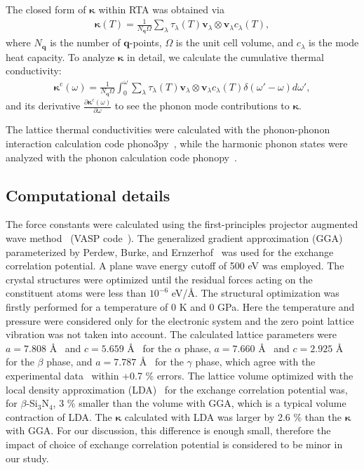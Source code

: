 \documentclass[twocolumn,amsmath,amssymb,a4paper,prb,superscriptaddress,floatfix]{revtex4-1}
\begin{document}
The closed form of $\boldsymbol{\kappa}$ within RTA was obtained via
\begin{align}
 \label{eq:kappa}
 \boldsymbol{\kappa}(T) = \frac{1}{N_\mathbf{q}\Omega} \sum_\lambda
 \tau_\lambda(T) \mathbf{v}_\lambda \otimes \mathbf{v}_\lambda c_\lambda(T),
\end{align}
where $N_\mathbf{q}$ is the number of
$\mathbf{q}$-points, $\Omega$ is the unit cell volume, and $c_\lambda$
is the mode heat capacity. To analyze $\boldsymbol{\kappa}$ in detail, we calculate
the cumulative thermal conductivity:
\begin{align}
 \label{eq:cum-kappa}
 \boldsymbol{\kappa}^\text{c}(\omega) = \frac{1}{N_\mathbf{q}\Omega}
 \int_0^\omega \sum_\lambda
 \tau_\lambda(T) \mathbf{v}_\lambda \otimes \mathbf{v}_\lambda
 c_\lambda(T) \delta(\omega'-\omega)d\omega',
\end{align}
and its derivative $\frac{\partial
\boldsymbol{\kappa}^\text{c}(\omega)}{\partial \omega}$ to see the phonon mode
contributions to $\boldsymbol{\kappa}$.

The lattice thermal conductivities were calculated with the phonon-phonon interaction calculation code
phono3py~\cite{phono3py}, while the harmonic phonon states were analyzed with
the phonon calculation code phonopy~\cite{phonopy}.

\subsection{Computational details}

The force constants were calculated using the first-principles projector
augmented wave method~\cite{paw} (VASP code~\cite{vasp-1996,vasp-1995,
vasp-1999}). The generalized gradient approximation (GGA) parameterized by
Perdew, Burke, and Ernzerhof~\cite{pbe} was used for the exchange correlation
potential. A plane wave energy cutoff of 500 eV was employed. The crystal
structures were optimized until the residual forces acting on the constituent
atoms were less than $10^{-6}$ eV/\AA. The structural optimization was firstly
performed for a temperature of 0 K and 0 GPa. Here the temperature and pressure
were considered only for the electronic system and the zero point lattice
vibration was not taken into account. The calculated lattice parameters were
$a=7.808$ \AA~ and $c=5.659$ \AA~ for the $\alpha$ phase, $a=7.660$ \AA~ and
$c=2.925$ \AA~ for the $\beta$ phase, and $a=7.787$ \AA~ for the $\gamma$ phase,
which agree with the experimental data~\cite{yashima,boulay,paszkowicz} within
+0.7 \% errors. The lattice volume optimized with the local density
approximation (LDA)~\cite{lda} for the exchange correlation potential was, for
$\beta$-Si$_3$N$_4$, 3 \% smaller than the volume with GGA, which is a typical
volume contraction of LDA. The $\boldsymbol{\kappa}$ calculated with LDA was
larger by 2.6 \% than the $\boldsymbol{\kappa}$ with GGA. For our discussion,
this difference is enough small, therefore the impact of choice of exchange
correlation potential is considered to be minor in our study.
\end{document}
